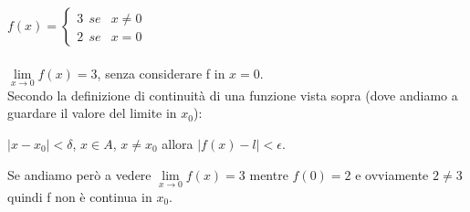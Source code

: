 $f(x) = 
    \begin{cases}
        3 \: \: se & x \neq 0 \\
        2 \: \: se & x = 0
    \end{cases}
    $\\ \\
$\lim\limits_{x\to 0}f(x) = 3$, senza considerare f in $x = 0$.\\
Secondo la definizione di continuità di una funzione vista sopra (dove andiamo a guardare il valore del limite in $x_0$):
\begin{center}
    $|x - x_0| < \delta$, $x \in A$, $x \neq x_0$ allora $|f(x) - l| < \epsilon$.
\end{center}
Se andiamo però a vedere $\lim\limits_{x\to 0}f(x) = 3$ mentre $f(0) = 2$ e ovviamente $2 \neq 3$ quindi f non è continua in $x_0$.




